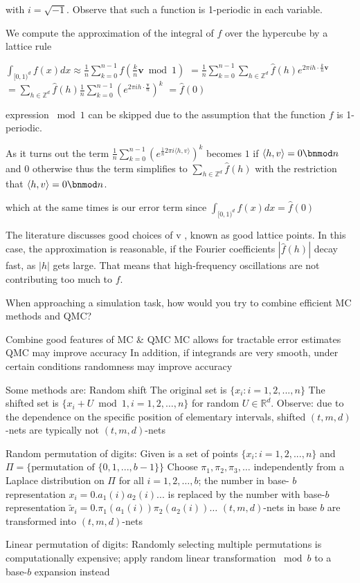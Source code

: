 with \(i = \sqrt{-1}\). Observe that such a function is 1-periodic in each variable.

We compute the approximation of the integral of \( f \) over the hypercube by a lattice rule

\( \int_{[0,1)^d} f(x) dx \approx \frac{1}{n} \sum_{k=0}^{n-1} f \left( \frac{k}{n} \mathbf{v} \bmod 1 \right) \)
\(= \frac{1}{n} \sum_{k=0}^{n-1} \sum_{h \in \mathbb{Z}^d} \hat{f}(h) e^{2 \pi i h \cdot \frac{k}{n} \mathbf{v}} \)
\(= \sum_{h \in \mathbb{Z}^d} \hat{f}(h) \frac{1}{n} \sum_{k=0}^{n-1} (e^{2 \pi i h \cdot \frac{\mathbf{v}}{n}})^k \)
\( = \hat{f}(0) \)

\The expression \( \bmod 1 \) can be skipped due to the assumption that the function \( f \)  is 1-periodic.

As it turns out the term \( \frac{1}{n}\sum_{k=0}^{n-1} (e^{\frac{1}{n}2\pi i \langle h, v\rangle})^k \)
becomes \( 1 \) if \( \langle h, v\rangle = 0 \bnmod n \) and \( 0 \) otherwise thus
the term simplifies to 
\( \sum_{h \in \mathbb{Z}^d} \hat{f}(h) \) with the restriction that \( \langle h, v\rangle = 0 \bnmod n\).

which at the same times is our error term since \( \int_{[0, 1)^{d}} f(x) dx = \hat{f}(0) \)

The literature discusses good choices of v , known as good lattice points.
In this case, the approximation is reasonable, if the Fourier coefficients \( |\hat{f}(h)| \) decay fast, as \(|h|\) gets large.
That means that high-frequency oscillations are not contributing too much to \( f \).

When approaching a simulation task, how would you try to combine efficient MC
methods and QMC?

Combine good features of MC & QMC
MC allows for tractable error estimates
QMC may improve accuracy
In addition, if integrands are very smooth, under certain conditions randomness may improve accuracy

Some methods are:
Random shift
The original set is \( \{x_i : i = 1, 2, ..., n\} \) 
The shifted set is \(\{x_i + U \bmod 1, i = 1, 2, \dots, n\}  \) for random \( U \in \mathbb{R}^d \).
Observe: due to the dependence on the specific position of elementary intervals, shifted \( (t, m, d) \)-nets are typically not \( (t, m, d) \)-nets

Random permutation of digits:
Given is a set of points \( \{x_i : i = 1, 2, ..., n\} \) and \( \Pi = \{ \text{permutation of } \{0, 1, ..., b-1\}\}\)
Choose \( \pi_1, \pi_2, \pi_3, \dots \) independently from a Laplace distribution on \( \Pi \)
for all \( i = 1, 2, \dots, b \); the number in base- \( b \) representation
\( x_i = 0.a_1(i) a_2(i) ... \) 
is replaced by the number with base-\( b \) representation
\( \tilde{x}_i = 0.\pi_1(a_1(i)) \pi_2(a_2(i)) \dots \)
\( (t, m, d) \)-nets in base \( b \) are transformed into \( (t, m, d) \)-nets

Linear permutation of digits:
Randomly selecting multiple permutations is computationally expensive;
apply random linear transformation \( \bmod b \) to a base-\( b \) expansion instead
